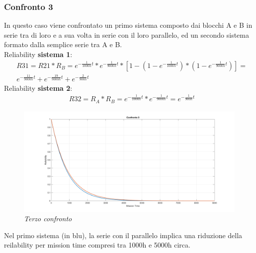 \subsubsection{Confronto 3}
In questo caso viene confrontato un primo sistema composto dai blocchi A e B in serie tra di loro e a sua volta in serie con il loro parallelo, ed un secondo sistema formato dalla semplice serie tra A e B.
\\
Reliability \textbf{sistema 1}:
\begin{equation*}
	\begin{split}
		&R31 = R21*R_B = e^{-\frac{1}{1000h} t}*e^{-\frac{1}{9000h} t}*[1-(1-e^{-\frac{1}{1000h} t})*(1-e^{-\frac{1}{9000h} t})] = \\
		&e^{-\frac{11}{9000h}t}+e^{-\frac{19}{9000h}t}+e^{-\frac{2}{900h}t}
	\end{split}
\end{equation*}
Reliability \textbf{sistema 2}:
\begin{equation*}
	\begin{split}
		&R32 = R_A*R_B = e^{-\frac{1}{1000h} t}*e^{-\frac{1}{9000h} t} = e^{-\frac{1}{900h}t}
	\end{split}
\end{equation*}
\begin{figure}[H]
	\centering
	\includegraphics[width=\textwidth]{img/hw5/es4_3.png}
	\caption{\textit{Terzo confronto}}
\end{figure}
Nel primo sistema (in blu), la serie con il parallelo implica una riduzione della reilability per mission time compresi tra 1000h e 5000h circa.
